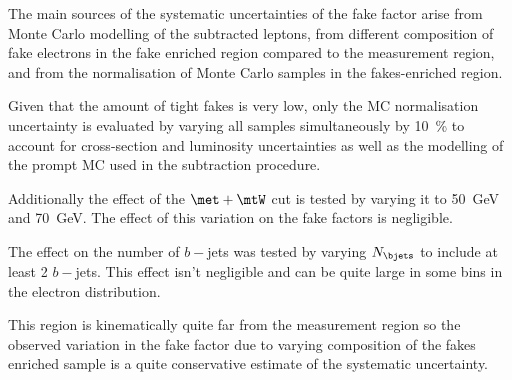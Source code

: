 The main sources of the systematic uncertainties of the fake factor arise from
Monte Carlo modelling of the subtracted leptons, from different composition
of fake electrons in the fake enriched region compared to the measurement region,
and from the normalisation of Monte Carlo samples in the fakes-enriched region.

Given that the amount of tight fakes is very low, only the MC normalisation
uncertainty is evaluated by varying all samples simultaneously by \qty{10}{\%} to account
for cross-section and luminosity uncertainties as well as the modelling of
the prompt MC used in the subtraction procedure.

Additionally the effect of the \( \met + \mtW \) cut is tested by varying it
to \qty{50}{\GeV} and \qty{70}{\GeV}. The effect of this variation on the fake
factors is negligible.

The effect on the number of \(b-\)jets was tested by varying \( N_{\bjets}\) to include at least 2 \(b-\)jets. This effect isn't negligible and can be quite large in some bins in the electron \pt distribution. 

This region is kinematically quite far from the measurement region so the observed
variation in the fake factor due to varying composition of the fakes enriched
sample is a quite conservative estimate of the systematic uncertainty.



